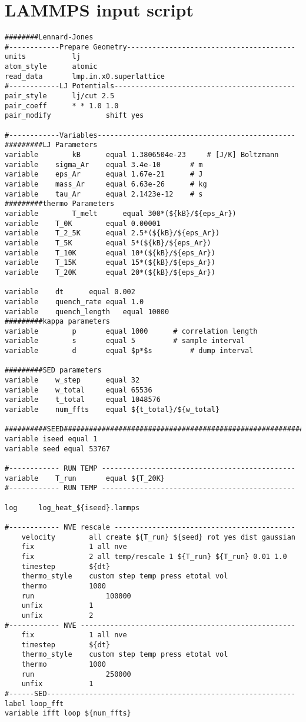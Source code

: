 \chapter{LAMMPS input script}
\begin{singlespace}
\begin{verbatim}
########Lennard-Jones
#------------Prepare Geometry----------------------------------------
units			lj
atom_style		atomic
read_data		lmp.in.x0.superlattice
#------------LJ Potentials-------------------------------------------
pair_style		lj/cut 2.5
pair_coeff		* * 1.0 1.0
pair_modify          	shift yes

#------------Variables-----------------------------------------------
#########LJ Parameters
variable    	kB 		equal 1.3806504e-23 	# [J/K] Boltzmann
variable	sigma_Ar 	equal 3.4e-10 		# m
variable	eps_Ar		equal 1.67e-21		# J
variable	mass_Ar		equal 6.63e-26		# kg
variable	tau_Ar		equal 2.1423e-12	# s
#########thermo Parameters
variable    	T_melt 		equal 300*(${kB}/${eps_Ar})
variable	T_0K		equal 0.00001
variable	T_2_5K		equal 2.5*(${kB}/${eps_Ar})
variable	T_5K		equal 5*(${kB}/${eps_Ar})
variable	T_10K		equal 10*(${kB}/${eps_Ar})
variable	T_15K		equal 15*(${kB}/${eps_Ar})
variable	T_20K		equal 20*(${kB}/${eps_Ar})

variable   	dt 		equal 0.002
variable	quench_rate	equal 1.0
variable	quench_length 	equal 10000
#########kappa parameters
variable    	p 		equal 1000 		# correlation length
variable    	s 		equal 5  		# sample interval
variable    	d 		equal $p*$s 		# dump interval 

#########SED parameters
variable	w_step		equal 32		
variable	w_total		equal 65536
variable	t_total		equal 1048576
variable	num_ffts	equal ${t_total}/${w_total}

##########SEED##########################################################
variable iseed equal 1
variable seed equal 53767 	

#------------ RUN TEMP ----------------------------------------------	
variable 	T_run 		equal ${T_20K}
#------------ RUN TEMP ----------------------------------------------

log 	log_heat_${iseed}.lammps

#------------ NVE rescale -------------------------------------------	
	velocity 		all create ${T_run} ${seed} rot yes dist gaussian
	fix 			1 all nve
	fix 			2 all temp/rescale 1 ${T_run} ${T_run} 0.01 1.0
	timestep		${dt}
	thermo_style  	custom step temp press etotal vol
	thermo			1000
	run             	100000	
	unfix 			1
	unfix 			2
#------------ NVE ---------------------------------------------------	
	fix 			1 all nve
	timestep		${dt}
	thermo_style  	custom step temp press etotal vol
	thermo			1000
	run             	250000	
	unfix 			1
#------SED-----------------------------------------------------------
label loop_fft
variable ifft loop ${num_ffts}


\end{verbatim}
\end{singlespace}
